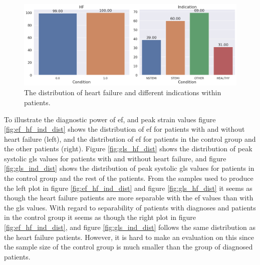 \begin{figure}[h]
    \begin{center}
    \includegraphics[width=\textwidth]{data-exp/hf_indication_dist.png}
    \end{center}
    \caption{The distribution of heart failure and different indications within patients.}
    \label{fig:hf_ind_dist}
\end{figure}

To illustrate the diagnostic power of \acrshort{ef}, and peak strain values figure \ref{fig:ef_hf_ind_dist} 
shows the distribution of \acrshort{ef} for patients with and without heart failure (left), and the distribution of \acrshort{ef} for patients in the control group and the other patients (right). 
Figure \ref{fig:gls_hf_dist} shows the distribution of peak systolic \acrshort{gls} values for patients with and without heart failure, 
and figure \ref{fig:gls_ind_dist} shows the distribution of peak systolic \acrshort{gls} values for patients in the control group and the rest of the patients. 
From the samples used to produce the left plot in figure \ref{fig:ef_hf_ind_dist} and figure \ref{fig:gls_hf_dist} 
it seems as though the heart failure patients are more separable with the \acrshort{ef} values than with the \acrshort{gls} values. 
With regard to separability of patients with diagnoses and patients in the control group it seems as though the right plot in figure \ref{fig:ef_hf_ind_dist}, 
and figure \ref{fig:gls_ind_dist} follows the same distribution as the heart failure patients. 
However, it is hard to make an evaluation on this since the sample size of the control group is much smaller than the group of diagnosed patients.\bigskip

